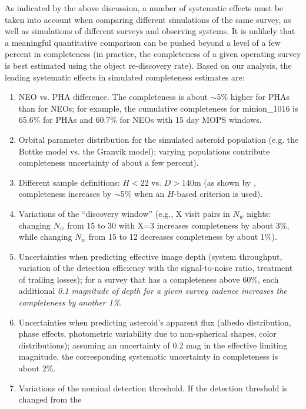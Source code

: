 As indicated by the above discussion, a number of systematic effects must be taken into account when
comparing different simulations of the same survey, as well as simulations of different surveys and observing
systems. It is unlikely that a meaningful quantitative comparison can be pushed beyond a level of a few percent
in completeness (in practice, the completeness of a given operating survey is best estimated using the object
re-discovery rate). Based on our analysis, the leading systematic effects in simulated completeness estimates are:
\begin{enumerate}
\item NEO vs. PHA difference. The completeness is about $\sim$5\% higher for PHAs than for NEOs; for example,
the cumulative completeness for minion\_1016 is 65.6\% for PHAs and 60.7\% for NEOs with 15 day MOPS windows.
\item Orbital parameter distribution for the simulated asteroid population (e.g. the Bottke model
             vs. the Granvik model); varying populations contribute completeness uncertainty of about a few percent).
\item Different sample definitions: $H<22$ vs. $D>140$m (as shown by \citealt{GMS2016}, completeness
           increases by $\sim$5\% when an $H$-based criterion is used).
\item Variations of the ``discovery window'' (e.g., X visit pairs in $N_w$ nights: changing $N_w$ from 15 to 30 with X=3 increases
          completeness by about 3\%, while changing $N_w$ from 15 to 12 decreases completeness by about 1\%).
\item Uncertainties when predicting effective image depth (system throughput, variation of the detection efficiency
          with the signal-to-noise ratio, treatment of trailing losses); for a survey that has a completeness above 60\%,
          each additional {\it 0.1 magnitude of depth for a given survey cadence increases the completeness by another 1\%}.
\item Uncertainties when predicting asteroid's apparent flux (albedo distribution, phase effects, photometric variability
          due to non-spherical shapes, color distributions); assuming an uncertainty of 0.2 mag in the effective
          limiting magnitude, the corresponding  systematic uncertainty in completeness is about 2\%.
\item Variations of the nominal detection threshold. If the detection threshold is changed from the

\end{enumerate}
